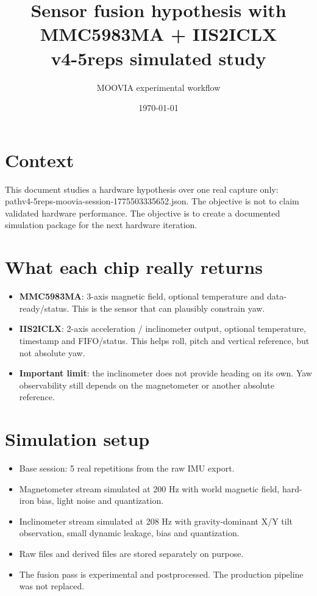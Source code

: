 \documentclass[11pt,a4paper]{article}
\title{Sensor fusion hypothesis with MMC5983MA + IIS2ICLX \\ \small{v4-5reps simulated study}}
\author{MOOVIA experimental workflow}
\date{\today}
\begin{document}
\maketitle
\section{Context}
This document studies a hardware hypothesis over one real capture only: \\path{v4-5reps-moovia-session-1775503335652.json}.
The objective is not to claim validated hardware performance. The objective is to create a documented simulation package for the next hardware iteration.
\section{What each chip really returns}
\begin{itemize}[leftmargin=1.4em]
\item \textbf{MMC5983MA}: 3-axis magnetic field, optional temperature and data-ready/status. This is the sensor that can plausibly constrain yaw.
\item \textbf{IIS2ICLX}: 2-axis acceleration / inclinometer output, optional temperature, timestamp and FIFO/status. This helps roll, pitch and vertical reference, but not absolute yaw.
\item \textbf{Important limit}: the inclinometer does not provide heading on its own. Yaw observability still depends on the magnetometer or another absolute reference.
\end{itemize}
\section{Simulation setup}
\begin{itemize}[leftmargin=1.4em]
\item Base session: 5 real repetitions from the raw IMU export.
\item Magnetometer stream simulated at 200 Hz with world magnetic field, hard-iron bias, light noise and quantization.
\item Inclinometer stream simulated at 208 Hz with gravity-dominant X/Y tilt observation, small dynamic leakage, bias and quantization.
\item Raw files and derived files are stored separately on purpose.
\item The fusion pass is experimental and postprocessed. The production pipeline was not replaced.
\end{itemize}
\end{document}
